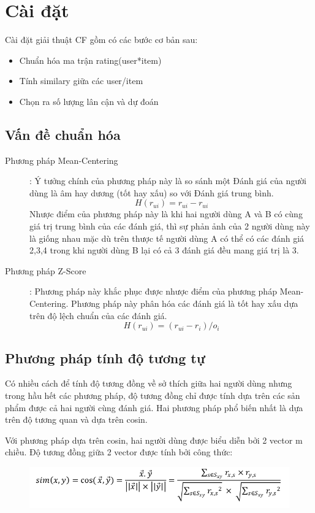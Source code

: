 \documentclass{report}
\begin{document}
	
\section{Cài đặt}	
Cài đặt giải thuật CF gồm có các bước cơ bản sau:
\begin{itemize}
	\item Chuẩn hóa ma trận rating(user*item)
	\item Tính similary giữa các user/item
	\item Chọn ra số lượng lân cận và dự đoán
	\end{itemize}
	
	\subsection{Vấn đề chuẩn hóa}
	\begin{description}
	\item [Phương pháp Mean-Centering]: Ý tưởng chính của phương
	pháp này là so sánh một Đánh giá của người dùng là âm
	hay dương (tốt hay xấu) so với Đánh giá trung bình.
	$$H (r_{ui}) = r_{ui} - r_{ui}$$
	Nhược điểm của phương pháp này là khi hai người dùng A
	và B có cùng giá trị trung bình của các đánh giá, thì sự
	phản ảnh của 2 người dùng này là giống nhau mặc dù trên
	thược tế người dùng A có thể có các đánh giá 2,3,4 trong
	khi người dùng B lại có cả 3 đánh giá đều mang giá trị là 3.
	\item [Phương pháp Z-Score]:
	Phương pháp này khắc phục được nhược điểm của phương
	pháp Mean-Centering. Phương pháp này phân hóa các
	đánh giá là tốt hay xấu dựa trên độ lệch chuẩn của các
	đánh giá.
	$$H (r_{ui}) = (r_{ui} - r_i) / o_i$$
	\end{description}
	
	\subsection{Phương pháp tính độ tương tự}
	Có nhiều cách để tính độ tương đồng về sở thích giữa hai người dùng nhưng trong hầu hết các phương pháp, độ tương đồng chỉ được tính dựa trên các sản phẩm được cả hai người cùng đánh giá. Hai phương pháp phổ biến nhất là dựa trên độ tương quan và dựa trên cosin.
	
	Với phương pháp dựa trên cosin, hai người dùng được biểu diễn bởi 2 vector m chiều. Độ tương đồng giữa 2 vector được tính bởi công thức:
	\begin{figure}[htp]
		\centering
		\includegraphics[scale=0.4]{img/pic8.png}
	\end{figure}
	
\end{document}
